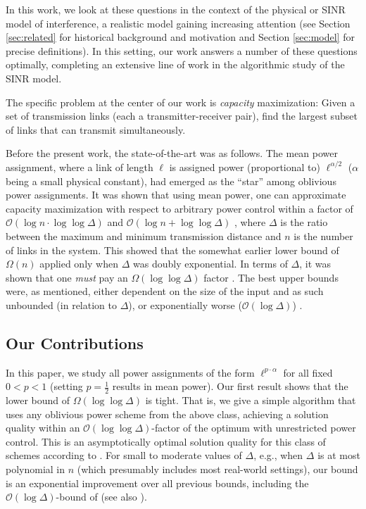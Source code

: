 \documentclass[11pt]{amsart}
\newcommand{\BO}{\mathcal{O}}
\begin{document}
In this work, we look at these questions in the context of the physical or SINR model
of interference, a realistic model gaining 
increasing
attention (see Section \ref{sec:related} for historical background and motivation and Section \ref{sec:model} for precise definitions). In this setting,
our work answers a number of these questions optimally, completing an extensive
line of work in the algorithmic study of the SINR model.

The specific problem at the center of our work is \emph{capacity} maximization: Given a set of transmission links (each a transmitter-receiver pair), 
find the largest subset of links that can transmit simultaneously.

Before the present work, the state-of-the-art was as follows. The mean power assignment,
where a link of length $\ell$ is assigned power (proportional to) $\ell^{\alpha/2}$ ($\alpha$ being a small
physical constant), had emerged as the ``star'' among oblivious power assignments. It was
shown that using mean power, one can approximate capacity maximization with respect to arbitrary power control 
within a factor of  $\BO(\log n \cdot \log\log\Delta)$
 \cite{us:esa09full} and $\BO(\log n + \log\log \Delta)$ \cite{SODA11}, where $\Delta$ is the ratio between the maximum and minimum
transmission distance and $n$ is the number of links in the system. 
This showed that the somewhat earlier lower bound of $\Omega(n)$ \cite{FKRV09} applied only when $\Delta$ was doubly exponential. In terms of $\Delta$, it was shown
that one \emph{must} pay an $\Omega(\log\log\Delta)$
factor \cite{us:esa09full}. The best upper bounds were, as mentioned, either dependent 
on the size of the input \cite{us:esa09full,SODA11} and as such
unbounded (in relation to $\Delta$), or exponentially worse  ($\BO(\log \Delta)$)
\cite{DBLP:conf/infocom/AndrewsD09,gouss2007a}.




\subsection{Our Contributions}


In this paper, we study all power assignments of the form $\ell^{p
  \cdot \alpha}$ for all fixed $0 < p < 1$ (setting $p = \frac12$
results in mean power). Our first result shows that the lower bound of
$\Omega(\log \log \Delta)$ is tight.  That is, we give a simple
algorithm that uses any oblivious power scheme from the above class,
achieving a solution quality within an $\BO(\log\log\Delta)$-factor of the 
optimum with unrestricted power control. This is an asymptotically optimal solution quality for this class of schemes according to \cite{us:esa09full}. For small to moderate values
of $\Delta$, e.g., when $\Delta$ is at most polynomial in $n$ (which
presumably includes most real-world settings), our bound is an
exponential improvement over all previous bounds, including the $\BO(\log
\Delta)$-bound of \cite{DBLP:conf/infocom/AndrewsD09} (see also
\cite{gouss2007a}).
\end{document}
